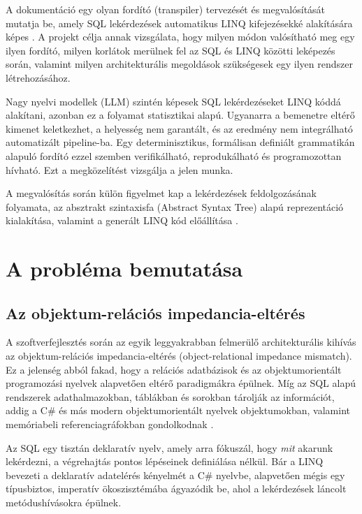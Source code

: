 \documentclass[a4paper,12pt]{article}
\begin{document}
A dokumentáció egy olyan fordító (transpiler) tervezését és megvalósítását mutatja be, amely SQL lekérdezések automatikus LINQ kifejezésekké alakítására képes \cite{nmorph2023}. A projekt célja annak vizsgálata, hogy milyen módon valósítható meg egy ilyen fordító, milyen korlátok merülnek fel az SQL és LINQ közötti leképezés során, valamint milyen architekturális megoldások szükségesek egy ilyen rendszer létrehozásához.

Nagy nyelvi modellek (LLM) szintén képesek SQL lekérdezéseket LINQ kóddá alakítani, azonban ez a folyamat statisztikai alapú. Ugyanarra a bemenetre eltérő kimenet keletkezhet, a helyesség nem garantált, és az eredmény nem integrálható automatizált pipeline-ba. Egy determinisztikus, formálisan definiált grammatikán alapuló fordító ezzel szemben verifikálható, reprodukálható és programozottan hívható. Ezt a megközelítést vizsgálja a jelen munka.

A megvalósítás során külön figyelmet kap a lekérdezések feldolgozásának folyamata, az absztrakt szintaxisfa (Abstract Syntax Tree) alapú reprezentáció kialakítása, valamint a generált LINQ kód előállítása \cite{parr2013antlr4}.

\section{A probléma bemutatása}

\subsection{Az objektum-relációs impedancia-eltérés}

A szoftverfejlesztés során az egyik leggyakrabban felmerülő architekturális kihívás az objektum-relációs impedancia-eltérés (object-relational impedance mismatch). Ez a jelenség abból fakad, hogy a relációs adatbázisok és az objektumorientált programozási nyelvek alapvetően eltérő paradigmákra épülnek. Míg az SQL alapú rendszerek adathalmazokban, táblákban és sorokban tárolják az információt, addig a C\# és más modern objektumorientált nyelvek objektumokban, valamint memóriabeli referenciagráfokban gondolkodnak \cite{skeet2019csharp}. 

Az SQL egy tisztán deklaratív nyelv, amely arra fókuszál, hogy \emph{mit} akarunk lekérdezni, a végrehajtás pontos lépéseinek definiálása nélkül. Bár a LINQ bevezeti a deklaratív adatelérés kényelmét a C\# nyelvbe, alapvetően mégis egy típusbiztos, imperatív ökoszisztémába ágyazódik be, ahol a lekérdezések láncolt metódushívásokra épülnek.
\end{document}
